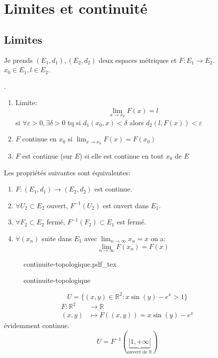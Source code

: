 \documentclass[a4paper]{report}
\newcommand\R{\ensuremath{\mathbb{R}}}
\let\epsilon\varepsilon
\theoremstyle{definition}
\newcommand{\incfig}[1]{%
    \def\svgwidth{\columnwidth}
    {#1.pdf_tex}
}
\begin{document}
\section{Limites et continuité}
\subsection{Limites}
Je prends $(E_1, d_1), (E_2, d_2)$ deux espaces métriques et $F: E_1 \to E_2$. $x_0 \in E_1, l \in E_2$.
\begin{definition}.
    \begin{enumerate}
        \item Limite:
            \[
            \lim_{x \to x_0} F(x) = l
            \] 
            si $\forall \epsilon > 0, \exists \delta > 0$ tq si $d_1(x_0, x) < \delta$ alors $d_2(l, F(x)) < \epsilon$
        \item $F$ continue en  $x_0$ si $\lim_{x \to x_0} F(x) = F(x_0)$
        \item $F$ est continue (sur $E$) si elle est continue en tout $x_0$ de $E$
\end{enumerate}
\end{definition}
\begin{prop}\label{prop:continuité-de-fonctions}
   Les propriétés suivantes sont équivalentes: 
   \begin{enumerate}
       \item $F: (E_1, d_1) \to  (E_2, d_2)$ est continue.
       \item $\forall U_2 \subset  E_2$ ouvert, $F^{-1}(U_2)$ est ouvert dans $E_1$.
       \item $\forall F_2 \subset E_2$ fermé, $F^{-1}(F_2) \subset E_1$ est fermé.
        \item $\forall (x_n)$ suite dans $E_1$ avec $\lim_{n \to \infty} x_n = x$ on a:
            \[
            \lim_{n \to \infty} F(x_n) = F(x)
            \] 
   \end{enumerate}
\end{prop}
\begin{figure}[H]
    \centering
    \incfig{continuite-topologique}
    \caption{continuite-topologique}
    \label{fig:continuite-topologique}
\end{figure}
\begin{eg}
   \[
       U = \{(x, y) \in \R^2: x \sin(y) - e^x > 1\}
   \]  
   \begin{align*}
       F: \R^2 &\longrightarrow \R \\
       (x, y) &\longmapsto F((x, y)) = x \sin(y) - e^x
   \end{align*}
   évidemment continue.
   \[
       U = F^{-1}(\underbrace{]1, +\infty[}_{\text{ouvert de } \R})
   \] 
\end{eg}
\end{document}
